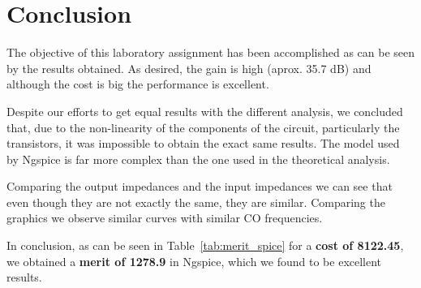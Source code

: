 \section{Conclusion}
\label{sec:conclusion}

\tab The objective of this laboratory assignment has been accomplished as can be seen by the results obtained. As desired, the gain is high (aprox. 35.7 dB) and although the cost is big the performance is excellent.

Despite our efforts to get equal results with the different analysis, we concluded that, due to the non-linearity of the components of the circuit, particularly the transistors, it was impossible to obtain the exact same results. The model used by Ngspice is far more complex than the one used in the theoretical analysis.

Comparing the output impedances and the input impedances we can see that even though they are not exactly the same, they are similar. Comparing the graphics we observe similar curves with similar CO frequencies.

In conclusion, as can be seen in Table~\ref{tab:merit_spice} for a \textbf{cost of 8122.45}, we obtained a \textbf{merit of 1278.9 }in Ngspice, which we found to be excellent results.
